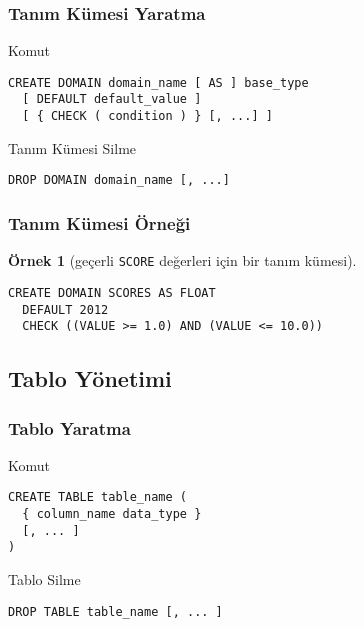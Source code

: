 \documentclass[dvipsnames]{beamer}
\theoremstyle{definition}
\theoremstyle{example}
\newtheorem{ornek}[theorem]{Örnek}
\theoremstyle{plain}
\begin{document}
\begin{frame}[fragile]
  \frametitle{Tanım Kümesi Yaratma}

  \begin{block}{Komut}
    \begin{lstlisting}
CREATE DOMAIN domain_name [ AS ] base_type
  [ DEFAULT default_value ]
  [ { CHECK ( condition ) } [, ...] ]
    \end{lstlisting}
  \end{block}

  \pause
  \medskip
  \begin{block}{Tanım Kümesi Silme}
    \begin{lstlisting}
DROP DOMAIN domain_name [, ...]
    \end{lstlisting}
  \end{block}
\end{frame}

\begin{frame}[fragile]
  \frametitle{Tanım Kümesi Örneği}

  \begin{ornek}[geçerli \texttt{SCORE} değerleri için bir tanım kümesi]
    \begin{lstlisting}
CREATE DOMAIN SCORES AS FLOAT
  DEFAULT 2012
  CHECK ((VALUE >= 1.0) AND (VALUE <= 10.0))
    \end{lstlisting}
  \end{ornek}
\end{frame}

\subsection{Tablo Yönetimi}

\begin{frame}[fragile]
  \frametitle{Tablo Yaratma}

  \begin{block}{Komut}
    \begin{lstlisting}
CREATE TABLE table_name (
  { column_name data_type }
  [, ... ]
)
    \end{lstlisting}
  \end{block}

  \pause
  \medskip
  \begin{block}{Tablo Silme}
    \begin{lstlisting}
DROP TABLE table_name [, ... ]
    \end{lstlisting}
  \end{block}
\end{frame}
\end{document}
